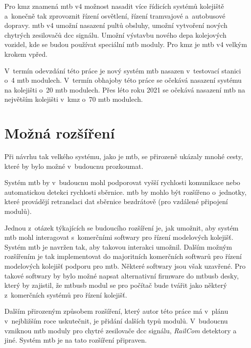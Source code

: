 Pro \gls{kmz} znamená \gls{mtb} v4 možnost nasadit více řídicích systémů
kolejiště a~konečně tak zprovoznit řízení osvětlení, řízení tramvajové
a~autobusové dopravy. \gls{mtb} v4 umožní nasazení pultů obsluhy, umožní
vytvoření nových chytrých zesilovačů \gls{dcc} signálu. Umožní výstavbu nového
depa kolejových vozidel, kde se budou používat speciální \gls{mtb} moduly.
Pro \gls{kmz} je \gls{mtb} v4 velkým krokem vpřed.

V~termín odevzdání této práce je nový systém \gls{mtb} nasazen v~testovací
stanici o~4 \gls{mtb} modulech. V~termín obhajoby této práce se očekává nasazení
systému na kolejišti o~20 \gls{mtb} modulech. Přes léto roku 2021 se očekává
nasazení \gls{mtb} na největším kolejišti v~\gls{kmz} o~70 \gls{mtb} modulech.

\section{Možná rozšíření} \label{sec:future}

Při návrhu tak velkého systému, jako je \gls{mtb}, se přirozeně ukázaly mnohé
cesty, které by bylo možné v~budoucnu prozkoumat.

Systém \gls{mtb} by v~budoucnu mohl podporovat vyšší rychlosti komunikace nebo
automatickou detekci rychlosti sběrnice. \gls{mtb} by mohlo být rozšířeno
o~jednotky, které provádějí retranslaci dat sběrnice bezdrátově (pro vzdálené
připojení modulů).

Jednou z~otázek týkajících se budoucího rozšíření je, jak umožnit, aby systém
\gls{mtb} mohl interagovat s~komerčními softwary pro řízení modelových
kolejišť. Systém \gls{mtb} je navržen tak, aby takovou interakci umožnil.
Dalším možným rozšířením je tak implementovat do majoritních komerčních
softwarů pro řízení modelových kolejišť podporu pro \gls{mtb}. Některé softwary
jsou však uzavřené. Pro takové softwary by bylo možné napsat alternativní
firmware do \gls{mtbusb} desky, který by zajistil, že \gls{mtbusb} modul se pro
počítač bude tvářit jako některý z~komerčních systémů pro řízení kolejišť.

Dalším přirozeným způsobem rozšíření, který autor této práce má v~plánu
v~nejbližším roce uskutečnit, je přidání dalších typů modulů. V~budoucnu
vzniknou \gls{mtb} moduly pro chytré zesilovače \gls{dcc} signálu,
\textit{RailCom} detektory a jiné. Systém \gls{mtb} je na tato rozšíření
připraven.
